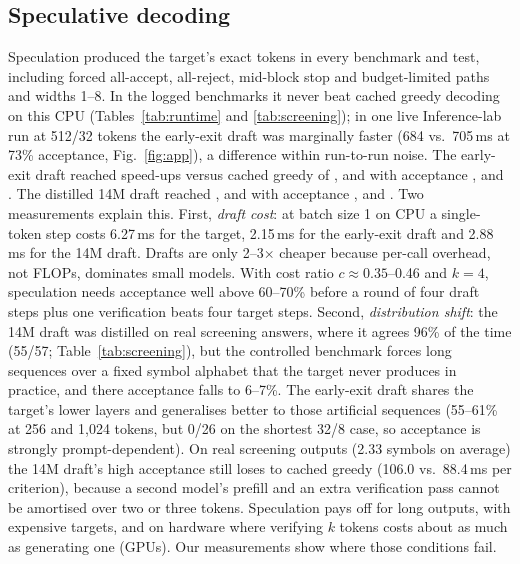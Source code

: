 \subsection{Speculative decoding}
Speculation produced the target's exact tokens in every benchmark and test, including forced all-accept, all-reject, mid-block stop and budget-limited paths and widths 1--8. In the logged benchmarks it never beat cached greedy decoding on this CPU (Tables~\ref{tab:runtime} and \ref{tab:screening}); in one live Inference-lab run at 512/32 tokens the early-exit draft was marginally faster (684 vs.\ 705\,ms at 73\% acceptance, Fig.~\ref{fig:app}), a difference within run-to-run noise. The early-exit draft reached speed-ups versus cached greedy of \SpecEES, \SpecEEM{} and \SpecEEL{} with acceptance \AccEES, \AccEEM{} and \AccEEL. The distilled 14M draft reached \SpecSmS, \SpecSmM{} and \SpecSmL{} with acceptance \AccSmS, \AccSmM{} and \AccSmL. Two measurements explain this. First, \emph{draft cost}: at batch size 1 on CPU a single-token step costs 6.27\,ms for the target, 2.15\,ms for the early-exit draft and 2.88\,ms for the 14M draft. Drafts are only 2--3$\times$ cheaper because per-call overhead, not FLOPs, dominates small models. With cost ratio $c\approx0.35$--0.46 and $k{=}4$, speculation needs acceptance well above 60--70\% before a round of four draft steps plus one verification beats four target steps. Second, \emph{distribution shift}: the 14M draft was distilled on real screening answers, where it agrees 96\% of the time (55/57; Table~\ref{tab:screening}), but the controlled benchmark forces long sequences over a fixed symbol alphabet that the target never produces in practice, and there acceptance falls to 6--7\%. The early-exit draft shares the target's lower layers and generalises better to those artificial sequences (55--61\% at 256 and 1{,}024 tokens, but 0/26 on the shortest 32/8 case, so acceptance is strongly prompt-dependent). On real screening outputs (2.33 symbols on average) the 14M draft's high acceptance still loses to cached greedy (106.0 vs.\ 88.4\,ms per criterion), because a second model's prefill and an extra verification pass cannot be amortised over two or three tokens. Speculation pays off for long outputs, with expensive targets, and on hardware where verifying $k$ tokens costs about as much as generating one (GPUs). Our measurements show where those conditions fail.

